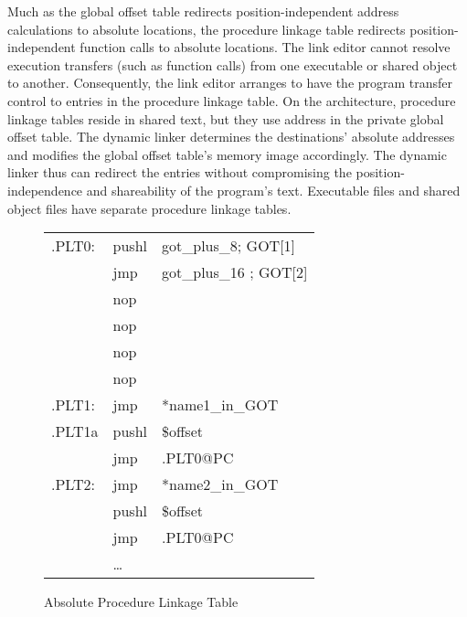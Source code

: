 Much as the global offset table redirects position-independent address
calculations to absolute locations, the procedure linkage table
redirects position-independent function calls to absolute locations.
The link editor cannot resolve execution transfers (such as function
calls) from one executable or shared object to another.  Consequently,
the link editor arranges to have the program transfer control to
entries in the procedure linkage table.  On the \xARCH architecture,
procedure linkage tables reside in shared text, but they use address
in the private global offset table.  The dynamic linker determines the
destinations' absolute addresses and modifies the global offset
table's memory image accordingly.  The dynamic linker thus can
redirect the entries without compromising the position-independence
and shareability of the program's text.  Executable files and shared
object files have separate procedure linkage tables.  


\begin{figure}[H]
\Hrule
\caption{Absolute Procedure Linkage Table}
\begin{center}
\begin{tabular}{|lll|}
\hline
.PLT0: & pushl & got\_plus\_8; GOT[1]\\
& jmp &got\_plus\_16 ; GOT[2] \\
& nop & \\
& nop & \\
& nop & \\
& nop & \\
.PLT1: & jmp & *name1\_in\_GOT\\
.PLT1a& pushl & \$offset \\
&jmp &.PLT0@PC \\
.PLT2: & jmp& *name2\_in\_GOT\\
&pushl & \$offset \\
& jmp & .PLT0@PC \\
&\dots&\\
\hline
\end{tabular}
\end{center}
\Hrule
\end{figure}


